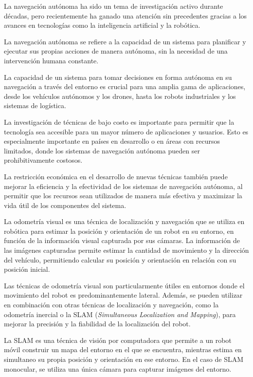 \documentclass[
11pt, %
codirector, %
]{charter}
\begin{document}
La navegación autónoma ha sido un tema de investigación activo durante décadas, pero recientemente ha ganado una atención sin precedentes gracias a los avances en tecnologías como la inteligencia artificial y la robótica.

La navegación autónoma se refiere a la capacidad de un sistema para planificar y ejecutar sus propias acciones de manera autónoma, sin la necesidad de una intervención humana constante.

La capacidad de un sistema para tomar decisiones en forma autónoma en su navegación a través del entorno es crucial para una amplia gama de aplicaciones, desde los vehículos autónomos y los drones, hasta los robots industriales y los sistemas de logística.

La investigación de técnicas de bajo costo es importante para permitir que la tecnología sea accesible para un mayor número de aplicaciones y usuarios. Esto es especialmente importante en países en desarrollo o en áreas con recursos limitados, donde los sistemas de navegación autónoma pueden ser prohibitivamente costosos. 

La restricción económica en el desarrollo de nuevas técnicas también puede mejorar la eficiencia y la efectividad de los sistemas de navegación autónoma, al permitir que los recursos sean utilizados de manera más efectiva y maximizar la vida útil de los componentes del sistema.

La odometría visual es una técnica de localización y navegación que se utiliza en robótica para estimar la posición y orientación de un robot en su entorno, en función de la información visual capturada por sus cámaras. La información de las imágenes capturadas permite estimar la cantidad de movimiento y la dirección del vehículo, permitiendo calcular su posición y orientación en relación con su posición inicial.

Las técnicas de odometría visual son particularmente útiles en entornos donde el movimiento del robot es predominantemente lateral. Además, se pueden utilizar en combinación con otras técnicas de localización y navegación, como la odometría inercial o la SLAM (\textit{Simultaneous Localization and Mapping}), para mejorar la precisión y la fiabilidad de la localización del robot.

La SLAM es una técnica de visión por computadora que permite a un robot móvil construir un mapa del entorno en el que se encuentra, mientras estima en simultaneo su propia posición y orientación en ese entorno. En el caso de SLAM monocular, se utiliza una única cámara para capturar imágenes del entorno.
\end{document}
